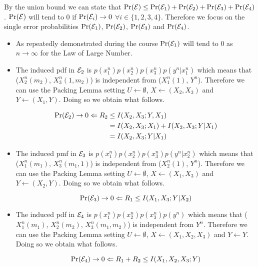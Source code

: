 By the union bound we can state that $\Pr(\mathcal{E}) \leq \Pr(\mathcal{E}_1) + \Pr(\mathcal{E}_2) + \Pr(\mathcal{E}_3) + \Pr(\mathcal{E}_4) $. $\Pr(\mathcal{E})$ will tend to $0$ if $\Pr(\mathcal{E}_i) \rightarrow 0$ $\forall i \in \{1,2,3,4\}$. Therefore we focus on the single error probabilities $\Pr(\mathcal{E}_1)$, $\Pr(\mathcal{E}_2)$, $\Pr(\mathcal{E}_3)$ and $\Pr(\mathcal{E}_4)$.

\begin{itemize}
	\item As repeatedly demonstrated during the course $\Pr(\mathcal{E}_1)$ will tend to 0 as $n \rightarrow \infty$ for the Law of Large Number.

	\item The induced pdf in $\mathcal{E}_2$ is $p(x_1^n)p(x_2^n)p(x_3^n)p(y^n|x_1^n)$ which means that ($X_2^n(m_2)$, $X_3^n(1,m_2)$) is independent from ($X_1^n(1)$, $Y^n$). Therefore we can use the Packing Lemma setting $U \leftarrow \emptyset $, $X \leftarrow (X_2,X_3)$ and $Y \leftarrow (X_1,Y)$. Doing so we obtain what follows.

	\begin{equation*}
	\begin{split}
		\Pr(\mathcal{E}_2) \rightarrow 0 \Leftarrow R_2 &\leq I(X_2,X_3;Y,X_1)\\
		&= I(X_2,X_3;X_1) + I(X_2,X_3;Y|X_1)\\
		&= I(X_2,X_3;Y|X_1)
		\end{split}
	\end{equation*}

	\item The induced pmf in $\mathcal{E}_3$ is $p(x_1^n)p(x_2^n)p(x_3^n)p(y^n|x_2^n)$ which means that ($X_1^n(m_1)$, $X_3^n(m_1,1)$) is independent from ($X_2^n(1)$, $Y^n$). Therefore we can use the Packing Lemma setting $U \leftarrow \emptyset $, $X \leftarrow (X_1,X_3)$ and $Y \leftarrow (X_2,Y)$. Doing so we obtain what follows.

	\begin{equation*}
		\Pr(\mathcal{E}_3) \rightarrow 0 \Leftarrow R_1 \leq I(X_1,X_3;Y|X_2)
	\end{equation*}

	\item The induced pdf in $\mathcal{E}_4$ is $p(x_1^n)p(x_2^n)p(x_3^n)p(y^n)$ which means that ($X_1^n(m_1)$, $X_2^n(m_2)$, $X_3^n(m_1,m_2)$) is independent from $Y^n$. Therefore we can use the Packing Lemma setting $U \leftarrow \emptyset $, $X \leftarrow (X_1, X_2, X_3)$ and $Y \leftarrow Y$. Doing so we obtain what follows.

	\begin{equation*}
		\Pr(\mathcal{E}_4) \rightarrow 0 \Leftarrow R_1+R_2 \leq I(X_1,X_2,X_3;Y)
	\end{equation*}
\end{itemize}

